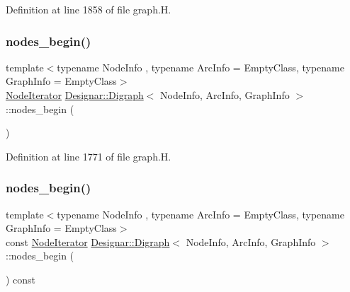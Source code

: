 Definition at line 1858 of file graph.\+H.

\mbox{\label{class_designar_1_1_digraph_af2a2ede7d4af852e67705f2c2bf394d2}} 
\subsubsection{\texorpdfstring{nodes\+\_\+begin()}{nodes\_begin()}\hspace{0.1cm}{\footnotesize\ttfamily [1/2]}}
{\footnotesize\ttfamily template$<$typename Node\+Info , typename Arc\+Info  = Empty\+Class, typename Graph\+Info  = Empty\+Class$>$ \\
\hyperlink{class_designar_1_1_digraph_1_1_node_iterator}{Node\+Iterator} \hyperlink{class_designar_1_1_digraph}{Designar\+::\+Digraph}$<$ Node\+Info, Arc\+Info, Graph\+Info $>$\+::nodes\+\_\+begin (\begin{DoxyParamCaption}{ }\end{DoxyParamCaption})\hspace{0.3cm}{\ttfamily [inline]}}



Definition at line 1771 of file graph.\+H.

\mbox{\label{class_designar_1_1_digraph_a6fcecdd41bdd4af1a0e1a7a5a3e8a3eb}} 
\subsubsection{\texorpdfstring{nodes\+\_\+begin()}{nodes\_begin()}\hspace{0.1cm}{\footnotesize\ttfamily [2/2]}}
{\footnotesize\ttfamily template$<$typename Node\+Info , typename Arc\+Info  = Empty\+Class, typename Graph\+Info  = Empty\+Class$>$ \\
const \hyperlink{class_designar_1_1_digraph_1_1_node_iterator}{Node\+Iterator} \hyperlink{class_designar_1_1_digraph}{Designar\+::\+Digraph}$<$ Node\+Info, Arc\+Info, Graph\+Info $>$\+::nodes\+\_\+begin (\begin{DoxyParamCaption}{ }\end{DoxyParamCaption}) const\hspace{0.3cm}{\ttfamily [inline]}}



